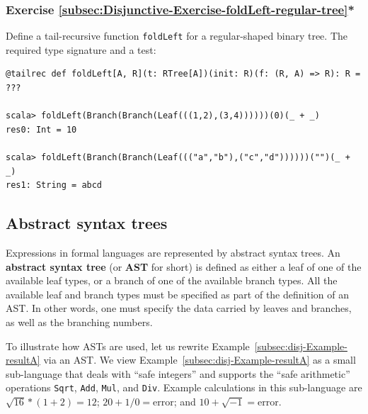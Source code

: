 \subsubsection{Exercise \label{subsec:Disjunctive-Exercise-foldLeft-regular-tree}\ref{subsec:Disjunctive-Exercise-foldLeft-regular-tree}{*}}

Define a tail-recursive function \lstinline!foldLeft! for a regular-shaped
binary tree. The required type signature and a test:
\begin{lstlisting}
@tailrec def foldLeft[A, R](t: RTree[A])(init: R)(f: (R, A) => R): R = ???

scala> foldLeft(Branch(Branch(Leaf(((1,2),(3,4))))))(0)(_ + _)
res0: Int = 10

scala> foldLeft(Branch(Branch(Leaf((("a","b"),("c","d"))))))("")(_ + _)
res1: String = abcd
\end{lstlisting}

\subsection{Abstract syntax trees}

Expressions in formal languages are represented by abstract syntax
trees. An \textbf{abstract syntax tree}\textbf{
}(or \textbf{AST} for short) is defined as either a leaf of one of
the available leaf types, or a branch of one of the available branch
types. All the available leaf and branch types must be specified as
part of the definition of an AST. In other words, one must specify
the data carried by leaves and branches, as well as the branching
numbers.

To illustrate how ASTs are used, let us rewrite Example~\ref{subsec:disj-Example-resultA}
via an AST. We view Example~\ref{subsec:disj-Example-resultA} as
a small sub-language that deals with \textsf{``}safe integers\textsf{''} and supports
the \textsf{``}safe arithmetic\textsf{''} operations \lstinline!Sqrt!, \lstinline!Add!,
\lstinline!Mul!, and \lstinline!Div!. Example calculations in this
sub-language are $\sqrt{16}*(1+2)=12$; $20+1/0=\text{error}$; and
$10+\sqrt{-1}=\text{error}$. 


